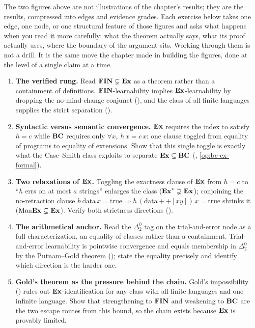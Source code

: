 The two figures above are not illustrations of the chapter's results; they are the results, compressed into edges and evidence grades. Each exercise below takes one edge, one node, or one structural feature of those figures and asks what happens when you read it more carefully: what the theorem actually says, what its proof actually uses, where the boundary of the argument sits. Working through them is not a drill. It is the same move the chapter made in building the figures, done at the level of a single claim at a time.

\begin{enumerate}[leftmargin=*,itemsep=3pt]
\item \textbf{The verified rung.} Read $\mathbf{FIN} \subsetneq \mathbf{Ex}$ as a theorem rather than a containment of definitions. $\mathbf{FIN}$-learnability implies $\mathbf{Ex}$-learnability by dropping the no-mind-change conjunct (), and the class of all finite languages supplies the strict separation ().

\item \textbf{Syntactic versus semantic convergence.} $\mathbf{Ex}$ requires the index to satisfy $h = c$ while $\mathbf{BC}$ requires only $\forall x,\ h\,x = c\,x$: one clause toggled from equality of programs to equality of extensions. Show that this single toggle is exactly what the Case--Smith class exploits to separate $\mathbf{Ex} \subsetneq \mathbf{BC}$ (\cite{CaseSmith1983}, \cref{op:bc-ex-formal}).

\item \textbf{Two relaxations of $\mathbf{Ex}$.} Toggling the exactness clause of $\mathbf{Ex}$ from $h = c$ to ``$h$ errs on at most $a$ strings'' enlarges the class ($\mathbf{Ex}^* \supsetneq \mathbf{Ex}$); conjoining the no-retraction clause $h\,\mathrm{data}\,x = \mathrm{true} \Rightarrow h\,(\mathrm{data} {+}{+} [xy])\,x = \mathrm{true}$ shrinks it ($\mathrm{Mon}\mathbf{Ex} \subsetneq \mathbf{Ex}$). Verify both strictness directions (\cite{CaseSmith1983,OshersonStobWeinstein1986}).

\item \textbf{The arithmetical anchor.} Read the $\Delta^0_2$ tag on the trial-and-error node as a full characterization, an equality of classes rather than a containment. Trial-and-error learnability is pointwise convergence and equals membership in $\Delta^0_2$ by the Putnam--Gold theorem (\cite{Putnam1965}); state the equality precisely and identify which direction is the harder one.

\item \textbf{Gold's theorem as the pressure behind the chain.} Gold's impossibility () rules out $\mathbf{Ex}$-identification for any class with all finite languages and one infinite language. Show that strengthening to $\mathbf{FIN}$ and weakening to $\mathbf{BC}$ are the two escape routes from this bound, so the chain exists because $\mathbf{Ex}$ is provably limited.


\end{enumerate}
